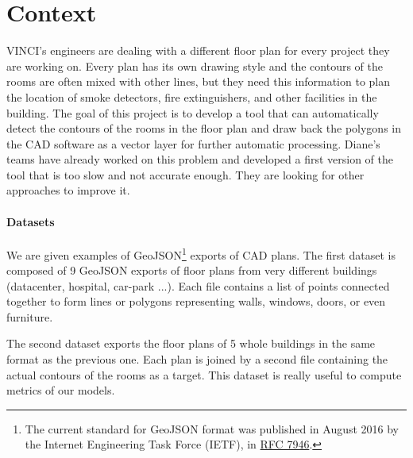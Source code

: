 \documentclass[11pt]{article}
\begin{document}

\section{Context}
VINCI's engineers are dealing with a different floor plan for every project they are working on.
Every plan has its own drawing style and the contours of the rooms are often mixed with other
lines, but they need this information to plan the location of smoke detectors, fire extinguishers,
and other facilities in the building. The goal of this project is to develop a tool that can
automatically detect the contours of the rooms in the floor plan and draw back the polygons in the CAD software as 
a vector layer for further automatic processing. 
Diane's teams have already worked on this problem and developed a first version of the tool
that is too slow and not accurate enough. They are looking for other approaches
to improve it.

\paragraph{Datasets}
We are given examples of GeoJSON\footnote{The current standard for GeoJSON format was 
published in August 2016 by the Internet Engineering Task Force (IETF), 
in \href{https://datatracker.ietf.org/doc/html/rfc7946}{RFC 7946}.} exports of CAD plans. The first dataset is 
composed of 9 GeoJSON exports of floor plans from very different buildings (datacenter, 
hospital, car-park ...). Each file contains a list of points 
connected together to form lines or polygons representing walls, windows, doors, 
or even furniture.

The second dataset exports the floor plans of 5 whole buildings in the same format
as the previous one. Each plan is joined by a second file 
containing the actual contours of the rooms as a target. This dataset is really useful 
to compute metrics of our models.

\end{document}
